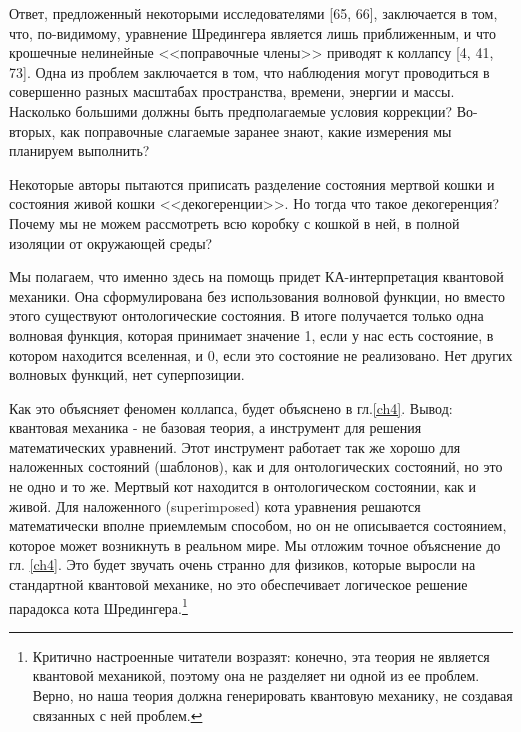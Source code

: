 \documentclass[main.tex]{subfiles}
\begin{document}
Ответ, предложенный некоторыми исследователями [65, 66], заключается в том, что, по-видимому, уравнение Шредингера является лишь приближенным, и что крошечные нелинейные <<поправочные члены>> приводят к коллапсу [4, 41, 73]. Одна из проблем заключается в том, что наблюдения могут проводиться в совершенно разных масштабах пространства, времени, энергии и массы. Насколько большими должны быть предполагаемые условия коррекции? Во-вторых, как поправочные слагаемые заранее знают, какие измерения мы планируем выполнить?

Некоторые авторы пытаются приписать разделение состояния мертвой кошки и состояния живой кошки <<декогеренции>>. Но тогда что такое декогеренция? Почему мы не можем рассмотреть всю коробку с кошкой в ней, в полной изоляции от окружающей среды?

Мы полагаем, что именно здесь на помощь придет КА-интерпретация квантовой механики. Она сформулирована без использования волновой функции, но вместо этого существуют онтологические состояния. В итоге получается только одна волновая функция, которая принимает значение 1, если у нас есть состояние, в котором находится вселенная, и 0, если это состояние не реализовано. Нет других волновых функций, нет суперпозиции.

Как это объясняет феномен коллапса, будет объяснено в гл.\ref{ch4}. Вывод: квантовая механика - не базовая теория, а инструмент для решения математических уравнений. Этот инструмент работает так же хорошо для наложенных состояний (шаблонов), как и для онтологических состояний, но это не одно и то же. Мертвый кот находится в онтологическом состоянии, как и живой. Для наложенного (superimposed) кота уравнения решаются математически вполне приемлемым способом, но он не описывается состоянием, которое может возникнуть в реальном мире. Мы отложим точное объяснение до гл. \ref{ch4}. Это будет звучать очень странно для физиков, которые выросли на стандартной квантовой механике, но это обеспечивает логическое решение парадокса кота Шредингера.\footnote{Критично настроенные читатели возразят: конечно, эта теория не является квантовой механикой, поэтому она не разделяет ни одной из ее проблем. Верно, но наша теория должна генерировать квантовую механику, не создавая связанных с ней проблем.}
\end{document}

